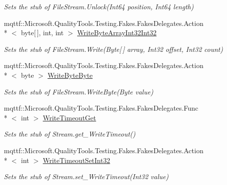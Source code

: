 \begin{DoxyCompactItemize}
\begin{DoxyCompactList}\small\item\em Sets the stub of File\-Stream.\-Unlock(\-Int64 position, Int64 length)\end{DoxyCompactList}\item 
mqttf\-::\-Microsoft.\-Quality\-Tools.\-Testing.\-Fakes.\-Fakes\-Delegates.\-Action\\*
$<$ byte\mbox{[}$\,$\mbox{]}, int, int $>$ \hyperlink{class_system_1_1_i_o_1_1_fakes_1_1_stub_file_stream_afa03f780bed510464728e30cb165315d}{Write\-Byte\-Array\-Int32\-Int32}
\begin{DoxyCompactList}\small\item\em Sets the stub of File\-Stream.\-Write(\-Byte\mbox{[}$\,$\mbox{]} array, Int32 offset, Int32 count)\end{DoxyCompactList}\item 
mqttf\-::\-Microsoft.\-Quality\-Tools.\-Testing.\-Fakes.\-Fakes\-Delegates.\-Action\\*
$<$ byte $>$ \hyperlink{class_system_1_1_i_o_1_1_fakes_1_1_stub_file_stream_adb9297cbbb6d37a63d6e249151558f2c}{Write\-Byte\-Byte}
\begin{DoxyCompactList}\small\item\em Sets the stub of File\-Stream.\-Write\-Byte(\-Byte value)\end{DoxyCompactList}\item 
mqttf\-::\-Microsoft.\-Quality\-Tools.\-Testing.\-Fakes.\-Fakes\-Delegates.\-Func\\*
$<$ int $>$ \hyperlink{class_system_1_1_i_o_1_1_fakes_1_1_stub_file_stream_a4b441fd79ddf879f49ce1099548adbff}{Write\-Timeout\-Get}
\begin{DoxyCompactList}\small\item\em Sets the stub of Stream.\-get\-\_\-\-Write\-Timeout()\end{DoxyCompactList}\item 
mqttf\-::\-Microsoft.\-Quality\-Tools.\-Testing.\-Fakes.\-Fakes\-Delegates.\-Action\\*
$<$ int $>$ \hyperlink{class_system_1_1_i_o_1_1_fakes_1_1_stub_file_stream_aad854f61a9ee54a9d4b9e9efedd20006}{Write\-Timeout\-Set\-Int32}
\begin{DoxyCompactList}\small\item\em Sets the stub of Stream.\-set\-\_\-\-Write\-Timeout(\-Int32 value)\end{DoxyCompactList}\end{DoxyCompactItemize}

